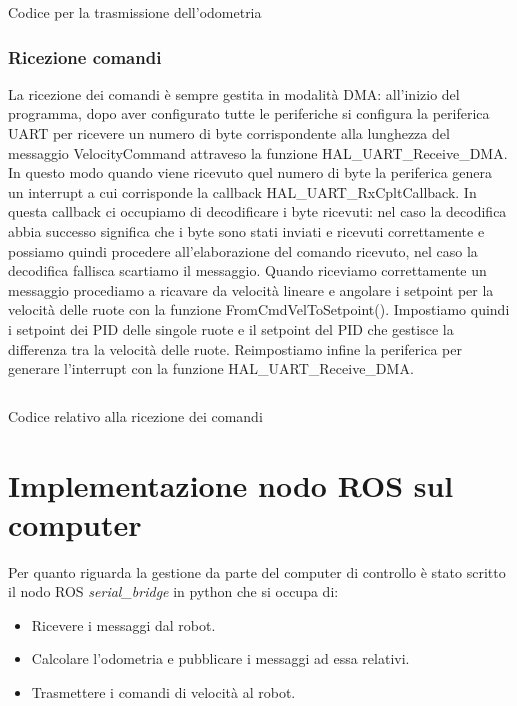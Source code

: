 \begin{listing}[H]
\inputminted[frame=single,framesep=10pt]{cpp}{codice/dma_tx_code.cpp}
\caption{Codice per la trasmissione dell'odometria}
\label{listing:trasmissione_dati}
\end{listing}


\subsubsection{Ricezione comandi}
La ricezione dei comandi è sempre gestita in modalità DMA: all'inizio del programma, dopo aver configurato tutte le periferiche si configura la periferica UART per ricevere un numero di byte corrispondente alla lunghezza del messaggio VelocityCommand attraveso la funzione HAL\_UART\_Receive\_DMA. In questo modo quando viene ricevuto quel numero di byte la periferica genera un interrupt a cui corrisponde la callback HAL\_UART\_RxCpltCallback.
In questa callback ci occupiamo di decodificare i byte ricevuti: nel caso la decodifica abbia successo significa che i byte sono stati inviati e ricevuti correttamente e possiamo quindi procedere all'elaborazione del comando ricevuto, nel caso la decodifica fallisca scartiamo il messaggio.
Quando riceviamo correttamente un messaggio procediamo a ricavare da velocità lineare e angolare i setpoint per la velocità delle ruote con la funzione FromCmdVelToSetpoint(). Impostiamo quindi i setpoint dei PID delle singole ruote e il setpoint del PID che gestisce la differenza tra la velocità delle ruote.
Reimpostiamo infine la periferica per generare l'interrupt con la funzione HAL\_UART\_Receive\_DMA.


\begin{listing}[H]
\inputminted[frame=single,framesep=10pt]{cpp}{codice/dma_rx_code.cpp}
\caption{Codice relativo alla ricezione dei comandi}
\label{listing:ricezione_dati}
\end{listing}


\section{Implementazione nodo ROS sul computer}
Per quanto riguarda la gestione da parte del computer di controllo è stato scritto il nodo ROS \textit{serial\_bridge} in python che si occupa di:

\begin{itemize}
    \item Ricevere i messaggi dal robot.
    \item Calcolare l'odometria e pubblicare i messaggi ad essa relativi.
    \item Trasmettere i comandi di velocità al robot.
\end{itemize}

